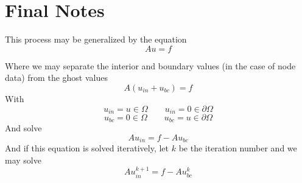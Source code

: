 \documentclass[11pt]{article}
\begin{document}
\section{Final Notes}
This process may be generalized by the equation
\begin{equation}
	Au = f
\end{equation}

Where we may separate the interior and boundary values (in the case of node data) from the ghost values
\begin{equation}
	A(u_{in} + u_{bc}) = f
\end{equation}
With
\begin{equation}
u_{in} = u \in \Omega \qquad u_{in} = 0 \in \partial \Omega
\end{equation}
\begin{equation}
u_{bc} = 0 \in \Omega \qquad u_{bc} = u \in \partial \Omega
\end{equation}
And solve
\begin{equation}
	Au_{in} = f - Au_{bc}
\end{equation}
And if this equation is solved iteratively, let $k$ be the iteration number and we may solve
\begin{equation}
	Au_{in}^{k+1} = f - Au_{bc}^k
\end{equation}
\end{document}
